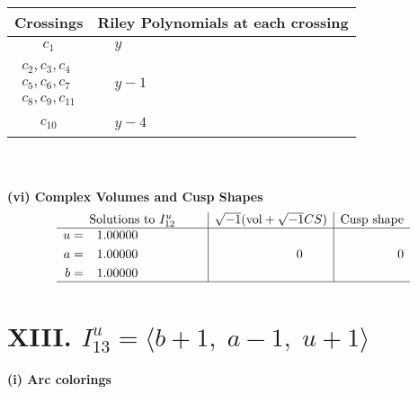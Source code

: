 \documentclass[1p]{elsarticle_modified}
\theoremstyle{definition}
\newcommand{\I}{\sqrt{-1}}
\begin{document}
\begin{tabular}{m{50pt}|m{274pt}}
Crossings & \hspace{64pt}Riley Polynomials at each crossing \\
\hline $$\begin{aligned}c_{1}\end{aligned}$$&$\begin{aligned}
&y
\end{aligned}$\\
\hline $$\begin{aligned}c_{2},c_{3},c_{4}\\c_{5},c_{6},c_{7}\\c_{8},c_{9},c_{11}\end{aligned}$$&$\begin{aligned}
&y-1
\end{aligned}$\\
\hline $$\begin{aligned}c_{10}\end{aligned}$$&$\begin{aligned}
&y-4
\end{aligned}$\\
\hline
\end{tabular}\\~\\
\newpage\flushleft \textbf{(vi) Complex Volumes and Cusp Shapes}
$$\begin{array}{c|c|c}  
\text{Solutions to }I^u_{12}& \I (\text{vol} + \sqrt{-1}CS) & \text{Cusp shape}\\
 \hline 
\begin{aligned}
u &= \phantom{-}1.00000\phantom{ +0.000000I} \\
a &= \phantom{-}1.00000\phantom{ +0.000000I} \\
b &= \phantom{-}1.00000\phantom{ +0.000000I}\end{aligned}
 & \phantom{-0.000000 } 0 & \phantom{-0.000000 } 0\\
 \hline 
 \end{array}$$\newpage\newpage\renewcommand{\arraystretch}{1}
\centering \section*{XIII. $I^u_{13}= \langle b+1,\;a-1,\;u+1 \rangle$}
\flushleft \textbf{(i) Arc colorings}\\
\end{document}
